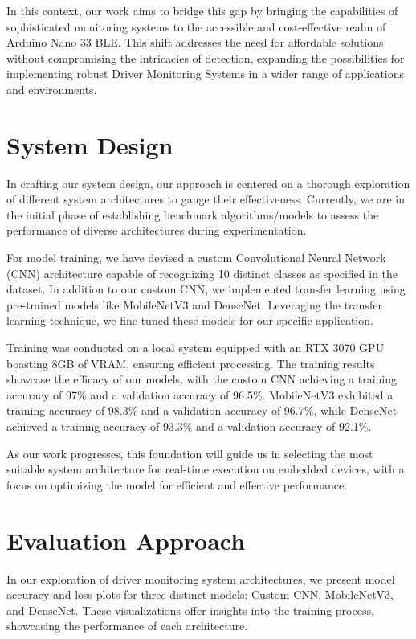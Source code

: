 \documentclass[journal,article,submit,pdftex,moreauthors]{Definitions/mdpi}
\begin{document}
In this context, our work aims to bridge this gap by bringing the capabilities of sophisticated monitoring systems to the accessible and cost-effective realm of Arduino Nano 33 BLE. This shift addresses the need for affordable solutions without compromising the intricacies of detection, expanding the possibilities for implementing robust Driver Monitoring Systems in a wider range of applications and environments.

\section{System Design}
In crafting our system design, our approach is centered on a thorough exploration of different system architectures to gauge their effectiveness. Currently, we are in the initial phase of establishing benchmark algorithms/models to assess the performance of diverse architectures during experimentation.

For model training, we have devised a custom Convolutional Neural Network (CNN) architecture capable of recognizing 10 distinct classes as specified in the dataset. In addition to our custom CNN, we implemented transfer learning using pre-trained models like MobileNetV3 and DenseNet. Leveraging the transfer learning technique, we fine-tuned these models for our specific application.

Training was conducted on a local system equipped with an RTX 3070 GPU boasting 8GB of VRAM, ensuring efficient processing. The training results showcase the efficacy of our models, with the custom CNN achieving a training accuracy of 97\% and a validation accuracy of 96.5\%. MobileNetV3 exhibited a training accuracy of 98.3\% and a validation accuracy of 96.7\%, while DenseNet achieved a training accuracy of 93.3\% and a validation accuracy of 92.1\%.

As our work progresses, this foundation will guide us in selecting the most suitable system architecture for real-time execution on embedded devices, with a focus on optimizing the model for efficient and effective performance.



\section{Evaluation Approach}

In our exploration of driver monitoring system architectures, we present model accuracy and loss plots for three distinct models: Custom CNN, MobileNetV3, and DenseNet. These visualizations offer insights into the training process, showcasing the performance of each architecture.
\end{document}
